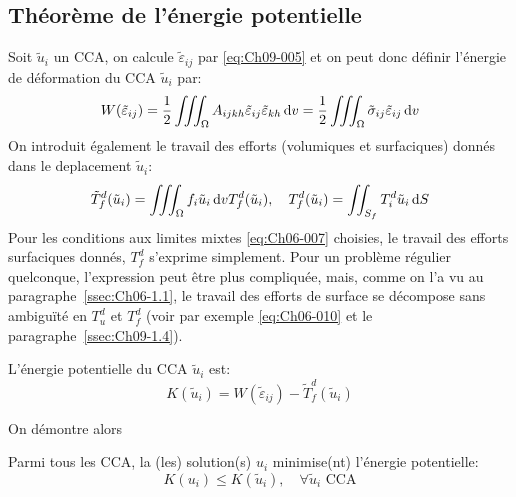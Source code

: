 \subsection{Théorème de l'énergie potentielle} \label{ssec:Ch09-1.2}
Soit $\tilde{u}_i$ un CCA, on calcule $\tilde{\varepsilon}_{ij}$ par \eqref{eq:Ch09-005} et on peut donc définir l'énergie de déformation du CCA $\tilde{u}_i$ par:
\begin{equation}
    W(\tilde{\varepsilon}_{ij}) = \frac{1}{2} \iiint_{\Omega} A_{ijkh} \tilde{\varepsilon}_{ij} \tilde{\varepsilon}_{kh} \mathop{\mathrm{{}d}}\mathopen{} v = \frac{1}{2} \iiint_{\Omega} \tilde{\sigma}_{ij} \tilde{\varepsilon}_{ij} \mathop{\mathrm{{}d}}\mathopen{} v
    \label{eq:Ch09-013}
\end{equation}
On introduit également le travail des efforts (volumiques et surfaciques) donnés dans le deplacement $\tilde{u}_i$:
\begin{equation}
    \tilde{T}_{f}^d (\tilde{u}_i) = \iiint_{\Omega} f_i \tilde{u}_i \mathop{\mathrm{{}d}}\mathopen{} v T_f^d (\tilde{u}_i),\quad T_f^d(\tilde{u}_i) = \iint_{S_f} T_i^d \tilde{u}_i \mathop{\mathrm{{}d}}\mathopen{} S
    \label{eq:Ch09-014}
\end{equation}
Pour les conditions aux limites mixtes \eqref{eq:Ch06-007} choisies, le travail des efforts surfaciques donnés, $T_f^d$ s'exprime simplement.
Pour un problème régulier quelconque, l'expression peut être plus compliquée, mais, comme on l'a vu au paragraphe~\ref{ssec:Ch06-1.1}, le travail des efforts de surface se décompose sans ambiguïté en $T_u^d$ et $T_f^d$ (voir par exemple \eqref{eq:Ch06-010} et le paragraphe~\ref{ssec:Ch09-1.4}). 
\begin{deff}
    L'énergie potentielle du CCA $\tilde{u}_i$ est:
    \begin{equation}
        K(\tilde{u}_i) = W(\tilde{\varepsilon}_{ij}) - \tilde{T}_f^d (\tilde{u}_i)
        \label{eq:Ch09-015}
    \end{equation}
\end{deff}
On 	démontre alors
\begin{thm}
    Parmi tous les CCA, la (les) solution(s) $u_i$ minimise(nt) l'énergie potentielle:
    \begin{equation}
        K(u_i) \leq K (\tilde{u}_i), \quad \forall \tilde{u}_i \text{ CCA}
        \label{eq:Ch09-016}
    \end{equation}
\end{thm}
